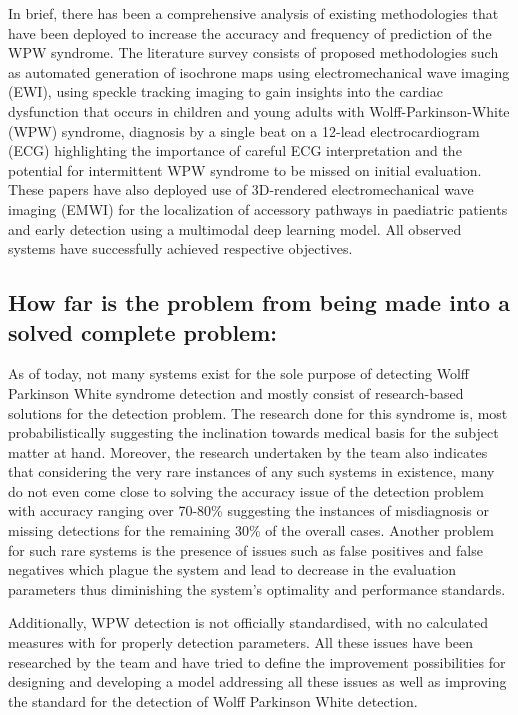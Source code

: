 In brief, there has been a comprehensive analysis of existing methodologies that have been deployed to increase the accuracy and frequency of prediction of the WPW syndrome. The literature survey consists of proposed methodologies such as automated generation of isochrone maps using electromechanical wave imaging (EWI), using speckle tracking imaging to gain insights into the cardiac dysfunction that occurs in children and young adults with Wolff-Parkinson-White (WPW) syndrome, diagnosis by a single beat on a 12-lead electrocardiogram (ECG) highlighting the importance of careful ECG interpretation and the potential for intermittent WPW syndrome to be missed on initial evaluation. These papers have also deployed use of 3D-rendered electromechanical wave imaging (EMWI) for the localization of accessory pathways in paediatric patients and early detection using a multimodal deep learning model. All observed systems have successfully achieved respective objectives. 

\subsection*{How far is the problem from being made into a solved complete problem:}   


As of today, not many systems exist for the sole purpose of detecting Wolff Parkinson White syndrome detection and mostly consist of research-based solutions for the detection problem. The research done for this syndrome is, most probabilistically suggesting the inclination towards medical basis for the subject matter at hand. Moreover, the research undertaken by the team also indicates that considering the very rare instances of any such systems in existence, many do not even come close to solving the accuracy issue of the detection problem with accuracy ranging over 70-80\% suggesting the instances of misdiagnosis or missing detections for the remaining 30\% of the overall cases. Another problem for such rare systems is the presence of issues such as false positives and false negatives which plague the system and lead to decrease in the evaluation parameters thus diminishing the system’s optimality and performance standards. 

Additionally, WPW detection is not officially standardised, with no calculated measures with for properly detection parameters. All these issues have been researched by the team and have tried to define the improvement possibilities for designing and developing a model addressing all these issues as well as improving the standard for the detection of Wolff Parkinson White detection. 

